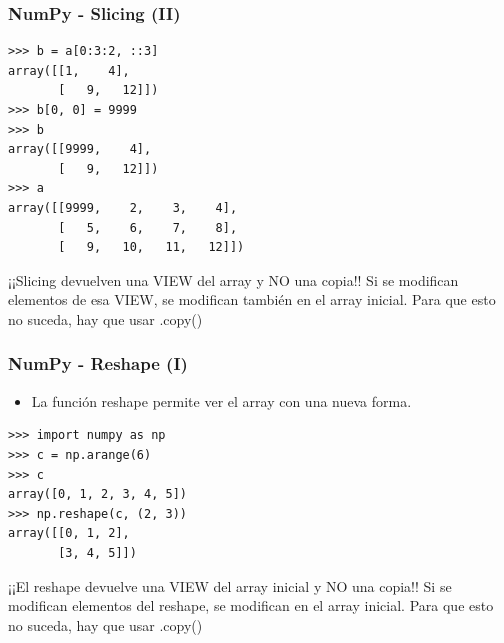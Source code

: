 \documentclass[18pt]{beamer}
\begin{document}
\begin{frame}[fragile]
	
	\frametitle{NumPy - Slicing (II)}
			
	\begin{exampleblock}
		
    	\small
    	\begin{lstlisting}    
>>> b = a[0:3:2, ::3]
array([[1,    4],
       [   9,   12]])
>>> b[0, 0] = 9999
>>> b
array([[9999,    4],
       [   9,   12]])
>>> a
array([[9999,    2,    3,    4],
       [   5,    6,    7,    8],
       [   9,   10,   11,   12]])

		\end{lstlisting}
		
	\end{exampleblock}			


	\begin{alertblock}{¡¡Slicing devuelven una VIEW del array y NO una copia!!}		
		Si se modifican elementos de esa VIEW, se modifican también en el array
		 inicial. Para que esto no suceda, hay que usar .copy()
	\end{alertblock}	
		
\end{frame}


\begin{frame}[fragile]
	
	\frametitle{NumPy - Reshape (I)}

	\begin{itemize}
		\item La función reshape permite ver el array con una nueva forma. 
	\end{itemize}
	
	\begin{exampleblock}
			
    	\small
    	\begin{lstlisting}
>>> import numpy as np
>>> c = np.arange(6)
>>> c
array([0, 1, 2, 3, 4, 5])
>>> np.reshape(c, (2, 3))
array([[0, 1, 2],
       [3, 4, 5]])
		\end{lstlisting}
				
	\end{exampleblock}

	\begin{alertblock}{¡¡El reshape devuelve una VIEW del array inicial y NO una copia!!}		
		Si se modifican elementos del reshape, se modifican en el array inicial.
		Para que esto no suceda, hay que usar .copy()
	\end{alertblock}		

\end{frame}
\end{document}
